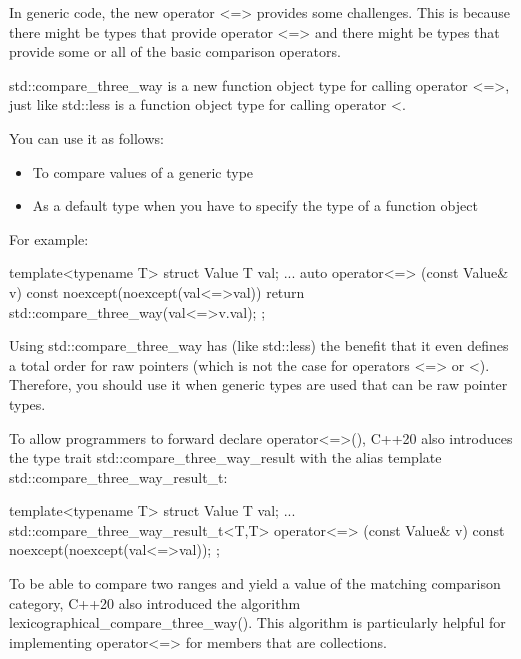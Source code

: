 
In generic code, the new operator <=> provides some challenges. This is because there might be types that provide operator <=> and there might be types that provide some or all of the basic comparison operators.


std::compare\_three\_way is a new function object type for calling operator <=>, just like std::less is a function object type for calling operator <.

You can use it as follows:

\begin{itemize}
\item
To compare values of a generic type

\item
As a default type when you have to specify the type of a function object
\end{itemize}

For example:

\begin{cpp}
template<typename T>
struct Value {
	T val{};
	...
	auto operator<=> (const Value& v) const noexcept(noexcept(val<=>val)) {
		return std::compare_three_way{}(val<=>v.val);
	}
};
\end{cpp}

Using std::compare\_three\_way has (like std::less) the benefit that it even defines a total order for raw pointers (which is not the case for operators <=> or <). Therefore, you should use it when generic types are used that can be raw pointer types.

To allow programmers to forward declare operator<=>(), C++20 also introduces the type trait std::compare\_three\_way\_result with the alias template std::compare\_three\_way\_result\_t:

\begin{cpp}
template<typename T>
struct Value {
	T val{};
	...
	std::compare_three_way_result_t<T,T>
		operator<=> (const Value& v) const noexcept(noexcept(val<=>val));
};
\end{cpp}


To be able to compare two ranges and yield a value of the matching comparison category, C++20 also introduced the algorithm lexicographical\_compare\_three\_way(). This algorithm is particularly helpful for implementing operator<=> for members that are collections.

